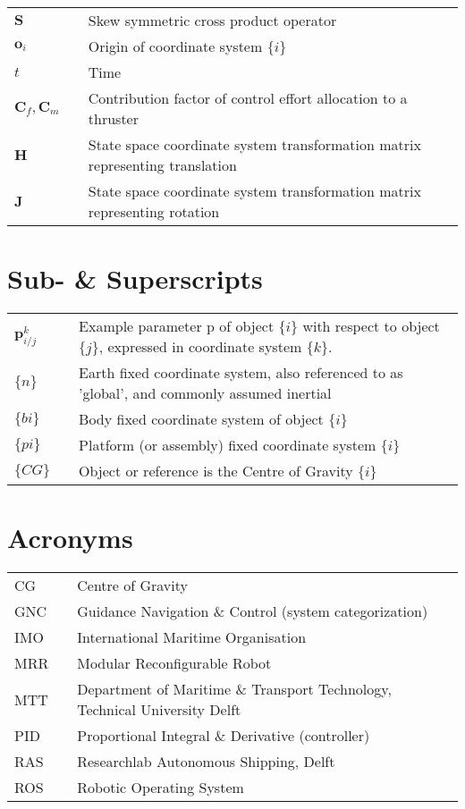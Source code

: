 \begin{center}
\begin{tabular}{p{1cm}p{3cm}p{10cm}}
		$ \textbf{S}$ & & Skew symmetric cross product operator \\[5pt]
		$\textbf{o}_i$ & & 	Origin of coordinate system $\{i\}$ \\[5pt]
		$t$ & & Time \\[5pt]
		$\textbf{C}_f,\textbf{C}_m$ & & Contribution factor of control effort allocation to a thruster \\[5pt]
		$\textbf{H}$ & & State space coordinate system transformation matrix representing translation \\[5pt]
		$\textbf{J}$ & & State space coordinate system transformation matrix representing rotation
	\end{tabular}
\end{center}

\section*{Sub- \& Superscripts}
\begin{center}
	\begin{tabular}{p{1cm}p{3cm}p{10cm}}
		$\textbf{p}_{i/j}^{k}$ & & Example parameter p of object $\{i\}$ with respect to object $\{j\}$, expressed in coordinate system $\{k\}$.\\[5pt]
		$\{n\}$ & & Earth fixed coordinate system, also referenced to as 'global', and commonly assumed inertial\\[5pt]
		$\{bi\}$ & & Body fixed coordinate system of object $\{i\}$\\[5pt]
		$\{pi\}$ & & Platform (or assembly) fixed coordinate system $\{i\}$ \\[5pt]
		$\{CG\}$ & & Object or reference is the Centre of Gravity $\{i\}$ \\[5pt]
	\end{tabular}
\end{center}	

\section*{Acronyms}
\begin{center}
	\begin{tabular}{p{1cm}p{3cm}p{10cm}}
		CG	&	&	Centre of Gravity \\[5pt]
		GNC & & Guidance Navigation \& Control (system categorization)\\[5pt]
		IMO & & International Maritime Organisation \\[5pt]
		MRR & & Modular Reconfigurable Robot\\[5pt]
		MTT & & Department of Maritime \& Transport Technology, Technical University Delft \\[5pt]
		PID & & Proportional Integral \& Derivative (controller)\\[5pt]
		RAS & & Researchlab Autonomous Shipping, Delft\\[5pt]
		ROS & & Robotic Operating System
	\end{tabular}
\end{center}
